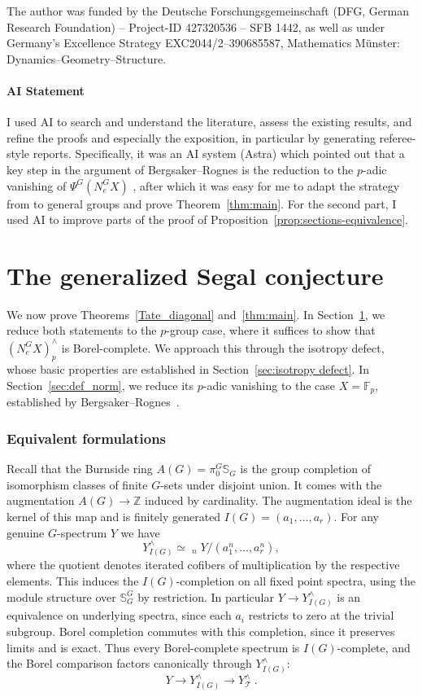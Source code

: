 \documentclass[11pt,a4paper]{article}
\theoremstyle{definition}
\newcommand{\Sph}{\mathbb S}
\newcommand{\Fp}{\mathbb F_p}
\newcommand{\Tt}{\mathcal T}
\newcommand{\invlim}{\mathop{\underleftarrow{\mathrm{lim}}}}
\newcommand{\NormG}{N_e^G}
\begin{document}
The author was funded by the Deutsche Forschungsgemeinschaft (DFG, German Research
Foundation) -- Project-ID 427320536 -- SFB 1442, as well as under Germany’s Excellence Strategy
EXC2044/2–390685587, Mathematics M\"unster: Dynamics–Geometry–Structure.

\subsection*{AI Statement}I used AI to search and understand the literature, assess the existing
results, and refine the proofs and especially the exposition, in particular by
generating referee-style reports. 
Specifically, it was an AI system (Astra) which pointed out
that a key step in the argument of Bergsaker--Rognes is the
reduction to the $p$-adic vanishing of $\Psi^G(\NormG X)$
\cite[Proposition~2.2]{BR}, after which it was easy for me  to adapt the
strategy from \cite[Section~III.1]{NS} to general groups and prove
Theorem~\ref{thm:main}. For the second part, I used AI to improve
parts of the proof of Proposition~\ref{prop:sections-equivalence}. 

\part{The generalized Segal conjecture}\label{part:segal}

We now prove Theorems~\ref{Tate_diagonal} and~\ref{thm:main}.
In Section~\ref{sec:equivalent}, we reduce both statements to the
$p$-group case, where it suffices to show that $(\NormG X)^\wedge_p$
is Borel-complete. We approach this through the isotropy defect,
whose basic properties are established in
Section~\ref{sec:isotropy defect}. In Section~\ref{sec:def_norm},
we reduce its $p$-adic vanishing to the case $X=\Fp$,
established by Bergsaker--Rognes~\cite{BR}.

\section{Equivalent formulations}\label{sec:equivalent}

Recall that the Burnside ring $A(G)=\pi_0^G\Sph_G$ is the group completion of isomorphism classes of finite $G$-sets under disjoint union. It comes with the augmentation $A(G) \to \mathbb{Z}$ induced by cardinality. The augmentation ideal is the kernel of this map and is finitely generated $I(G)=(a_1,\ldots,a_r)$. For any genuine $G$-spectrum $Y$ we have
\[
 Y^\wedge_{I(G)}\simeq
 \invlim_n Y/(a_1^n,\ldots,a_r^n),
\]
where the quotient denotes iterated cofibers of multiplication by the respective elements.
This induces the $I(G)$-completion on all fixed point spectra, using the module structure over $\Sph_G^G$ by restriction. In particular $Y\to Y^\wedge_{I(G)}$ is an equivalence on underlying
spectra, since each $a_i$ restricts to zero at the trivial subgroup.
Borel completion commutes with this completion, since it preserves limits
and is exact. 
Thus every Borel-complete spectrum is $I(G)$-complete, and the Borel
comparison factors canonically through $Y^\wedge_{I(G)}$:
\[
Y \to Y^\wedge_{I(G)} \to Y^\wedge_{\Tt} \ .
\]
\end{document}
